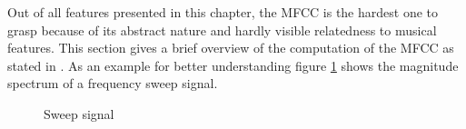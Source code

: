 Out of all features presented in this chapter, the MFCC is the hardest one to grasp because of its abstract nature and hardly visible relatedness to musical features. This section gives a brief overview of the computation of the MFCC as stated in \cite[pp. 55ff]{knees1}.
As an example for better understanding figure \ref{sweep} shows the magnitude spectrum of a frequency sweep signal.
\begin{figure}[htbp]
	\centering
	\caption{Sweep signal}	
	\label{sweep}
\end{figure}
